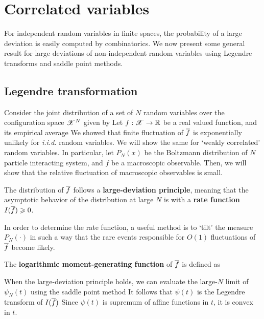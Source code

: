 \documentclass[letterpaper,english,10pt]{article}
\begin{document}
\section{Correlated variables}
For independent random variables in finite spaces, 
the probability of a large deviation is easily computed by combinatorics. 
We now present some general result for large deviations of non-independent random variables using  Legendre transforms and saddle point methods. 

\subsection{Legendre transformation} 
Consider the joint distribution of a set of $N$ random variables over the configuration space $\mathscr{X}^N$ given by 
Let $f: \mathscr{X} \to \mathbb{R}$ be a real valued function, and its empirical average 
We showed that finite fluctuation of $\overline{f}$ is exponentially unlikely for \emph{i.i.d.} random variables. 
We will show the same for `weakly correlated' random variables. 
In particular, let $P_N(x)$ be the Boltzmann distribution of $N$ particle interacting system, and $f$ be a macroscopic observable. 
Then, we will show that the relative fluctuation of macroscopic observables is small. 
\begin{assum}
The distribution of $\overline{f}$ follows a \textbf{large-deviation principle}, meaning that the asymptotic behavior of the distribution at large $N$ is 
with a \textbf{rate function} $I(\overline{f}) \geqslant 0$. 
\end{assum}
In order to determine the rate function, a useful method is to `tilt' the measure $P_N(\cdot)$ in such
a way that the rare events responsible for $O(1)$ fluctuations of $\overline{f}$ become likely. 
\begin{defn} 
The \textbf{logarithmic moment-generating function} of $\overline{f}$ is defined as 
\end{defn}
When the large-deviation principle holds, we can evaluate the large-$N$ limit of $\psi_N(t)$ using the saddle point method
It follows that $\psi(t)$ is the Legendre transform of $I(\overline{f})$
Since $\psi(t)$ is supremum of affine functions in $t$, it is convex in $t$. 
\end{document}
